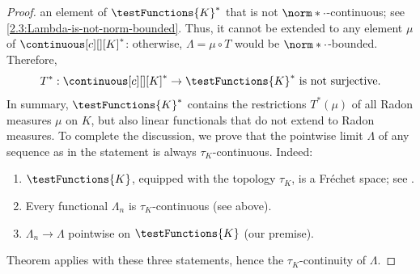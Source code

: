 \begin{proof}
an element of $\testFunctions{K}^\ast$ that is not $\norm*{\cdot}$-continuous; see \eqref{2.3:Lambda-is-not-norm-bounded}. %
Thus, it cannot be extended to any element $\mu$ of $\continuous[c][][K]^\ast$: otherwise, $\Lambda = \mu \circ T$ would be %
$\norm*{\cdot}$-bounded. Therefore,
%
\begin{equation}
  \text{$T^\ast: \continuous[c][][K]^\ast \to \testFunctions{K}^\ast$ is not surjective.}
\end{equation}
%
In summary, $\testFunctions{K}^\ast$ contains the restrictions $T^\ast(\mu)$ of all Radon measures $\mu$ on $K$, but also %
linear functionals that do not extend to Radon measures.
\skipline
To complete the discussion, we prove that the pointwise limit $\Lambda$ of any sequence as in the statement is always %
$\tau_K$-continuous. Indeed: %
% 
\begin{enumerate}[item-label=(\alph{enumi})]
  \item{$\testFunctions{K}$, equipped with the topology $\tau_K$, is a Fréchet space; see .}
  \item{Every functional $\Lambda_n$ is $\tau_K$-continuous (see above).}
  \item{
      $\Lambda_n \longrightarrow \Lambda$ pointwise on $\testFunctions{K}$ (our premise).
    }
\end{enumerate}
% 
Theorem  applies with these three statements, hence the $\tau_K$-continuity of $\Lambda$.

\end{proof}
